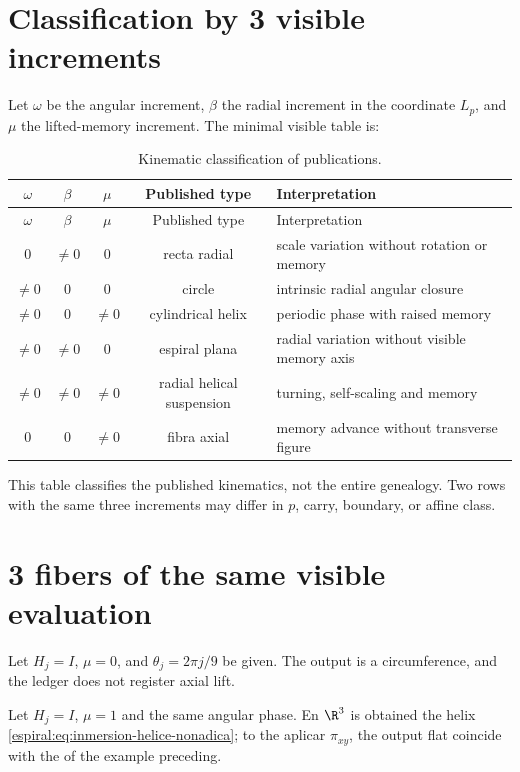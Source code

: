 \section{Classification by 3 visible increments}

Let \(\omega\) be the angular increment, \(\beta\) the radial increment in
the coordinate \(L_p\), and \(\mu\) the lifted-memory increment. The minimal
visible table is:
\begin{longtable}{ccccp{}}
\caption{Kinematic classification of publications.}
\label{espiral:tab:clasificacion-cinematica}\\
\toprule
\(\omega\)&\(\beta\)&\(\mu\)&Published type&Interpretation\\
\midrule
\endfirsthead
\toprule
\(\omega\)&\(\beta\)&\(\mu\)&Published type&Interpretation\\
\midrule
\endhead
0&\(\neq0\)&0&recta radial&scale variation without rotation or memory\\
\(\neq0\)&0&0&circle&intrinsic radial angular closure\\
\(\neq0\)&0&\(\neq0\)&cylindrical helix&periodic phase with raised memory\\
\(\neq0\)&\(\neq0\)&0&espiral plana&radial variation without visible memory axis\\
\(\neq0\)&\(\neq0\)&\(\neq0\)&radial helical suspension&turning, self-scaling and memory\\
0&0&\(\neq0\)&fibra axial&memory advance without transverse figure\\
\bottomrule
\end{longtable}

This table classifies the published kinematics, not the entire genealogy.
Two rows with the same three increments may differ in \(p\), carry,
boundary, or affine class.

\section{3 fibers of the same visible evaluation}

\begin{example}
Let \(H_j=I\), \(\mu=0\), and \(\theta_j=2\pi j/9\) be given. The output is a
circumference, and the ledger does not register axial lift.
\end{example}

\begin{example}
Let \(H_j=I\), \(\mu=1\) and the same angular phase. En \(\R^3\) is obtained the
helix \cref{espiral:eq:inmersion-helice-nonadica}; to the aplicar \(\pi_{xy}\), the
output flat coincide with the of the example preceding.
\end{example}

